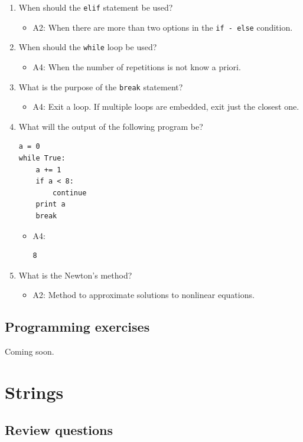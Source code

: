 \documentclass[article,A4,12pt]{llncs}
\begin{document}
\begin{enumerate}
\item When should the {\tt elif} statement be used?
  \begin{itemize}
    \item A2: When there are more than two options in the {\tt if - else} condition. 
  \end{itemize}
\item When should the {\tt while} loop be used?
  \begin{itemize}
    \item A4: When the number of repetitions is not know a priori.
  \end{itemize}
\item What is the purpose of the {\tt break} statement?
  \begin{itemize}
    \item A4: Exit a loop. If multiple loops are embedded, exit just the closest one.
  \end{itemize}
\item What will the output of the following program be?
\begin{verbatim}
a = 0
while True:
    a += 1
    if a < 8:
        continue
    print a
    break
\end{verbatim}
  \begin{itemize}
    \item A4:
\begin{verbatim}
8
\end{verbatim}
  \end{itemize}
\item What is the Newton's method?
  \begin{itemize}
    \item A2: Method to approximate solutions to nonlinear equations.
  \end{itemize}
\end{enumerate}


\subsection{Programming exercises}

Coming soon.

\section{Strings}

\subsection{Review questions}
\end{document}
